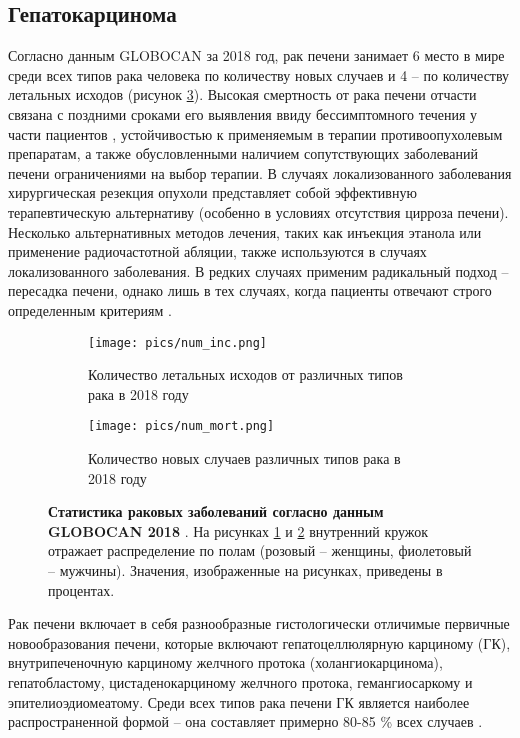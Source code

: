 \subsection{Гепатокарцинома}

Согласно данным GLOBOCAN за 2018 год, рак печени занимает 6 место в мире среди всех типов рака человека по количеству новых случаев и 4 – по количеству летальных исходов \cite{bray_global_2018} (рисунок \ref{fig:statistics}). Высокая смертность от рака печени отчасти связана с поздними сроками его выявления ввиду бессимптомного течения у части пациентов \cite{befeler_hepatocellular_2002}, устойчивостью к применяемым в терапии противоопухолевым препаратам, а также обусловленными наличием сопутствующих заболеваний печени ограничениями на выбор терапии. В случаях локализованного заболевания хирургическая резекция опухоли представляет собой эффективную терапевтическую альтернативу (особенно в условиях отсутствия цирроза печени). Несколько альтернативных методов лечения, таких как инъекция этанола или применение радиочастотной абляции, также используются в случаях локализованного заболевания. В редких случаях применим радикальный подход – пересадка печени, однако лишь в тех случаях, когда пациенты отвечают строго определенным критериям \cite{farazi_hepatocellular_2006}.

\begin{figure}[H]
\captionsetup[subfigure]{justification=centering}
\centering
	\begin{subfigure}{0.49\textwidth}
		\texttt{[image: pics/num\_inc.png]} 
		\caption{Количество летальных исходов от различных типов рака в 2018 году}
		\label{fig:inc}
	\end{subfigure}
	\begin{subfigure}{0.49\textwidth}
		\texttt{[image: pics/num\_mort.png]}
		\caption{Количество новых случаев различных типов рака в 2018 году}
		\label{fig:mort}
	\end{subfigure}
	\caption{\textbf{Статистика раковых заболеваний согласно данным GLOBOCAN 2018} \cite{bray_global_2018}. На рисунках \ref{fig:inc} и \ref{fig:mort} внутренний кружок отражает распределение по полам (розовый -- женщины, фиолетовый -- мужчины). Значения, изображенные на рисунках, приведены в процентах.}
	\label{fig:statistics}
\end{figure}

Рак печени включает в себя разнообразные гистологически отличимые первичные новообразования печени, которые включают гепатоцеллюлярную карциному (ГК), внутрипеченочную карциному желчного протока (холангиокарцинома), гепатобластому, цистаденокарциному желчного протока, гемангиосаркому и эпителиоэдиомеатому. Среди всех типов рака печени ГК является наиболее распространенной формой – она составляет примерно 80-85 \% всех случаев \cite{farazi_hepatocellular_2006}. 

